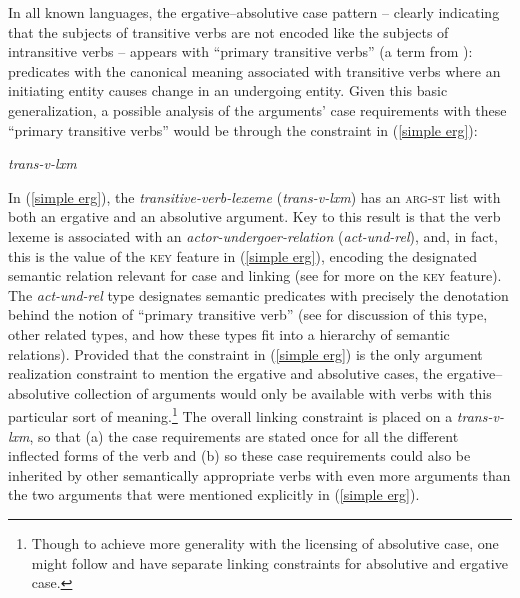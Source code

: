 \documentclass[output=paper
 	        ,biblatex
                ,babelshorthands
                ,newtxmath
                ,draftmode
                ,colorlinks, citecolor=brown
]{langscibook}
\begin{document}
In all known  languages, the ergative--absolutive case pattern -- clearly indicating that the subjects of transitive verbs are not encoded like the subjects of intransitive verbs -- appears with ``primary transitive verbs'' (a term from \citealt{andrews85,andrews072nded}): predicates with the canonical meaning associated with transitive verbs where an initiating entity causes change in an undergoing entity. Given this basic generalization, a possible analysis of the arguments' case requirements with these ``primary transitive verbs'' would be through the constraint in (\ref{simple erg}):
%
\begin{exe}
\ex\label{simple erg}
\emph{trans-v-lxm} \impl 
{}
\end{exe}
%
In (\ref{simple erg}), the \textit{transitive-verb-lexeme} (\textit{trans-v-lxm}) has an
\textsc{arg-st} list with both an ergative and an absolutive argument. Key to this result is that
the verb lexeme is associated with an \textit{actor-undergoer-relation} (\textit{act-und-rel}), and,
in fact, this is the value of the \textsc{key} feature in (\ref{simple erg}), encoding the
designated semantic relation relevant for case and linking (see \citealt{KD2006a-u} 
for more on the \textsc{key} feature). The \textit{act-und-rel} type designates semantic predicates with precisely
the denotation behind the notion of ``primary transitive verb'' (see \citealt[75--134]{Davis2001a-u}
for discussion of this type, other related types, and how these types fit into a hierarchy of
semantic relations). Provided that the constraint in (\ref{simple erg}) is the only argument
realization constraint to mention the ergative and absolutive cases, the ergative--absolutive
collection of arguments would only be available with verbs with this particular sort of
meaning.\footnote{Though to achieve more generality with the licensing of absolutive case, one might
  follow \citet[Chapter~7]{ball08thesis} and have separate linking constraints for absolutive and
  ergative case.} The overall linking constraint is placed on a \textit{trans-v-lxm}, so that (a)
the case requirements are stated once for all the different inflected forms of the verb and (b) so
these case requirements could also be inherited by other semantically appropriate verbs with even
more arguments than the two arguments that were mentioned explicitly in (\ref{simple erg}).
\end{document}

